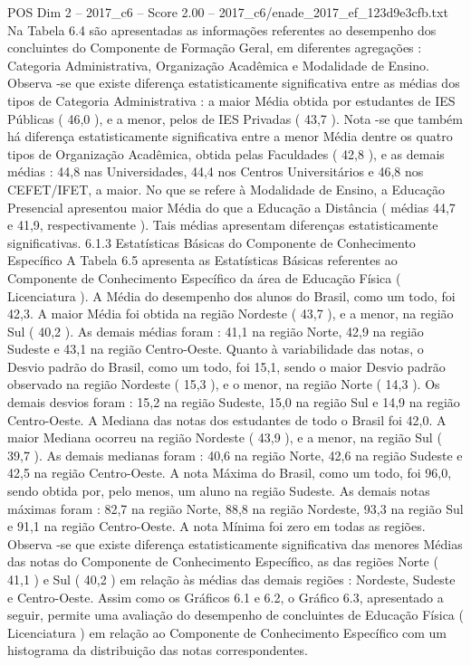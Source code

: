 \begin{textsample}{POS Dim 2 – 2017\_c6 – Score 2.00 – 2017\_c6/enade\_2017\_ef\_123d9e3cfb.txt}
Na Tabela 6.4 são apresentadas as informações referentes ao desempenho dos concluintes do Componente de Formação Geral, em diferentes agregações : Categoria Administrativa, Organização Acadêmica e Modalidade de Ensino.
Observa -se que existe diferença estatisticamente significativa entre as médias dos tipos de Categoria Administrativa : a maior Média obtida por estudantes de IES Públicas ( 46,0 ), e a menor, pelos de IES Privadas ( 43,7 ).
Nota -se que também há diferença estatisticamente significativa entre a menor Média dentre os quatro tipos de Organização Acadêmica, obtida pelas Faculdades ( 42,8 ), e as demais médias : 44,8 nas Universidades, 44,4 nos Centros Universitários e 46,8 nos CEFET/IFET, a maior.
No que se refere à Modalidade de Ensino, a Educação Presencial apresentou maior Média do que a Educação a Distância ( médias 44,7 e 41,9, respectivamente ).
Tais médias apresentam diferenças estatisticamente significativas. 6.1.3 Estatísticas Básicas do Componente de Conhecimento Específico A Tabela 6.5 apresenta as Estatísticas Básicas referentes ao Componente de Conhecimento Específico da área de Educação Física ( Licenciatura ).
A Média do desempenho dos alunos do Brasil, como um todo, foi 42,3.
A maior Média foi obtida na região Nordeste ( 43,7 ), e a menor, na região Sul ( 40,2 ).
As demais médias foram : 41,1 na região Norte, 42,9 na região Sudeste e 43,1 na região Centro-Oeste.
Quanto à variabilidade das notas, o Desvio padrão do Brasil, como um todo, foi 15,1, sendo o maior Desvio padrão observado na região Nordeste ( 15,3 ), e o menor, na região Norte ( 14,3 ).
Os demais desvios foram : 15,2 na região Sudeste, 15,0 na região Sul e 14,9 na região Centro-Oeste.
A Mediana das notas dos estudantes de todo o Brasil foi 42,0.
A maior Mediana ocorreu na região Nordeste ( 43,9 ), e a menor, na região Sul ( 39,7 ).
As demais medianas foram : 40,6 na região Norte, 42,6 na região Sudeste e 42,5 na região Centro-Oeste.
A nota Máxima do Brasil, como um todo, foi 96,0, sendo obtida por, pelo menos, um aluno na região Sudeste.
As demais notas máximas foram : 82,7 na região Norte, 88,8 na região Nordeste, 93,3 na região Sul e 91,1 na região Centro-Oeste.
A nota Mínima foi zero em todas as regiões.
Observa -se que existe diferença estatisticamente significativa das menores Médias das notas do Componente de Conhecimento Específico, as das regiões Norte ( 41,1 ) e Sul ( 40,2 ) em relação às médias das demais regiões : Nordeste, Sudeste e Centro-Oeste.
Assim como os Gráficos 6.1 e 6.2, o Gráfico 6.3, apresentado a seguir, permite uma avaliação do desempenho de concluintes de Educação Física ( Licenciatura ) em relação ao Componente de Conhecimento Específico com um histograma da distribuição das notas correspondentes.

\end{textsample}
